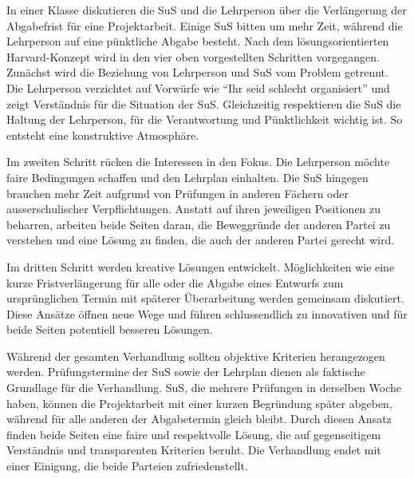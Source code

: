 \begin{myExBox}[title=Anwendung 2: Verhandlung mit Schülern]
In einer Klasse diskutieren die SuS und die Lehrperson über die Verlängerung der Abgabefrist für eine Projektarbeit. Einige SuS bitten um mehr Zeit, während die Lehrperson auf eine pünktliche Abgabe besteht. Nach dem lösungsorientierten Harvard-Konzept wird in den vier oben vorgestellten Schritten vorgegangen.
Zunächst wird die Beziehung von Lehrperson und SuS vom Problem getrennt. Die Lehrperson verzichtet auf Vorwürfe wie \enquote{Ihr seid schlecht organisiert} und zeigt Verständnis für die Situation der SuS. Gleichzeitig respektieren die SuS die Haltung der Lehrperson, für die Verantwortung und Pünktlichkeit wichtig ist. So entsteht eine konstruktive Atmosphäre.

Im zweiten Schritt rücken die Interessen in den Fokus. Die Lehrperson möchte faire Bedingungen schaffen und den Lehrplan einhalten. Die SuS hingegen brauchen mehr Zeit aufgrund von Prüfungen in anderen Fächern oder ausserschulischer Verpflichtungen. Anstatt auf ihren jeweiligen Positionen zu beharren, arbeiten beide Seiten daran, die Beweggründe der anderen Partei zu verstehen und eine Lösung zu finden, die auch der anderen Partei gerecht wird.

Im dritten Schritt werden kreative Lösungen entwickelt. Möglichkeiten wie eine kurze Fristverlängerung für alle oder die Abgabe eines Entwurfs zum ursprünglichen Termin mit späterer Überarbeitung werden gemeinsam diskutiert. Diese Ansätze öffnen neue Wege und führen schlussendlich zu innovativen und für beide Seiten potentiell besseren Lösungen.

Während der gesamten Verhandlung sollten objektive Kriterien herangezogen werden. Prüfungstermine der SuS sowie der Lehrplan dienen als faktische Grundlage für die Verhandlung. SuS, die mehrere Prüfungen in derselben Woche haben, können die Projektarbeit mit einer kurzen Begründung später abgeben, während für alle anderen der Abgabetermin gleich bleibt. Durch diesen Ansatz finden beide Seiten eine faire und respektvolle Lösung, die auf gegenseitigem Verständnis und transparenten Kriterien beruht. Die Verhandlung endet mit einer Einigung, die beide Parteien zufriedenstellt.

\end{myExBox}




